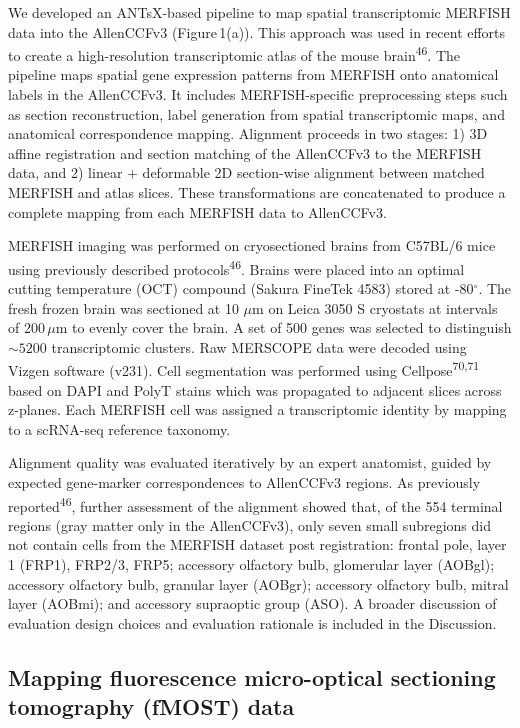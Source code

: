 \documentclass[
  12pt,
]{article}
\begin{document}
We developed an ANTsX-based pipeline to map spatial transcriptomic
MERFISH data into the AllenCCFv3 (Figure\,1(a)). This approach was used
in recent efforts to create a high-resolution transcriptomic atlas of
the mouse brain\textsuperscript{46}. The pipeline maps spatial gene
expression patterns from MERFISH onto anatomical labels in the
AllenCCFv3. It includes MERFISH-specific preprocessing steps such as
section reconstruction, label generation from spatial transcriptomic
maps, and anatomical correspondence mapping. Alignment proceeds in two
stages: 1) 3D affine registration and section matching of the AllenCCFv3
to the MERFISH data, and 2) linear + deformable 2D section-wise
alignment between matched MERFISH and atlas slices. These
transformations are concatenated to produce a complete mapping from each
MERFISH data to AllenCCFv3.

MERFISH imaging was performed on cryosectioned brains from C57BL/6 mice
using previously described protocols\textsuperscript{46}. Brains were
placed into an optimal cutting temperature (OCT) compound (Sakura
FineTek 4583) stored at -80\(^\circ\). The fresh frozen brain was
sectioned at 10 \(\mu\)m on Leica 3050 S cryostats at intervals of
200\,\(\mu\)m to evenly cover the brain. A set of 500 genes was selected
to distinguish \(\sim5200\) transcriptomic clusters. Raw MERSCOPE data
were decoded using Vizgen software (v231). Cell segmentation was
performed using Cellpose\textsuperscript{70,71} based on DAPI and PolyT
stains which was propagated to adjacent slices across z-planes. Each
MERFISH cell was assigned a transcriptomic identity by mapping to a
scRNA-seq reference taxonomy.

Alignment quality was evaluated iteratively by an expert anatomist,
guided by expected gene-marker correspondences to AllenCCFv3 regions. As
previously reported\textsuperscript{46}, further assessment of the
alignment showed that, of the 554 terminal regions (gray matter only in
the AllenCCFv3), only seven small subregions did not contain cells from
the MERFISH dataset post registration: frontal pole, layer 1 (FRP1),
FRP2/3, FRP5; accessory olfactory bulb, glomerular layer (AOBgl);
accessory olfactory bulb, granular layer (AOBgr); accessory olfactory
bulb, mitral layer (AOBmi); and accessory supraoptic group (ASO). A
broader discussion of evaluation design choices and evaluation rationale
is included in the Discussion.

\subsection{Mapping fluorescence micro-optical sectioning tomography
(fMOST)
data}\label{mapping-fluorescence-micro-optical-sectioning-tomography-fmost-data}
\end{document}
